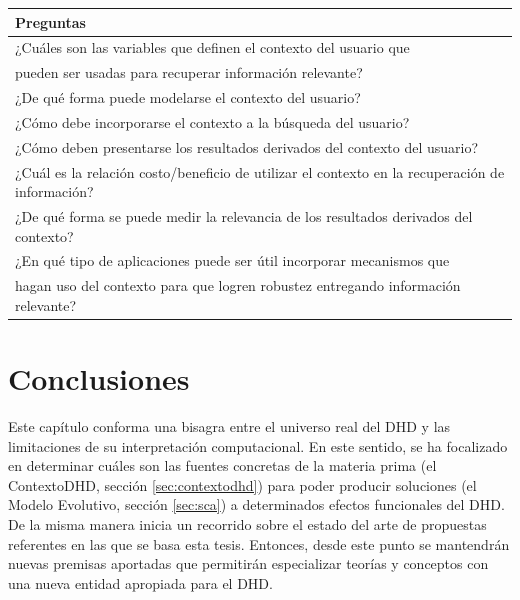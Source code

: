 \begin{center}

\begin{tabular}[t]{|l|}
\hline
\rowcolor[gray]{0.7} Preguntas \\
\hline


\item ¿Cuáles son las variables que definen el contexto del usuario que\\
pueden ser usadas para recuperar información relevante? \\
\hline
\item ¿De qué forma puede modelarse el contexto del usuario? \\
\hline
\item ¿Cómo debe incorporarse el contexto a la búsqueda del usuario?\\
\hline
\item ¿Cómo deben presentarse los resultados derivados del contexto del
usuario?\\
\hline
\item ¿Cuál es la relación costo/beneficio de utilizar el contexto en la
recuperación de información?\\
\hline
\item ¿De qué forma se puede medir la relevancia de los resultados derivados del
contexto?\\
\hline
\item ¿En qué tipo de aplicaciones puede ser útil incorporar mecanismos
que\\
hagan uso del contexto para que logren robustez entregando información
relevante?\\
\hline


\end{tabular}
\end{center}




\section{Conclusiones}

Este capítulo conforma una bisagra entre el universo real del DHD y
las limitaciones de su interpretación computacional. En este sentido, se ha focalizado en determinar cuáles son las fuentes concretas de la
materia prima (el ContextoDHD, sección \ref{sec:contextodhd}) para poder
producir soluciones (el Modelo Evolutivo, sección \ref{sec:sca})
a determinados efectos funcionales del DHD. De la misma manera inicia un
recorrido sobre el estado del arte de propuestas referentes en las que se basa
esta tesis. Entonces, desde este punto se mantendrán nuevas premisas aportadas
que permitirán especializar teorías y conceptos con una nueva entidad
apropiada para el DHD.

